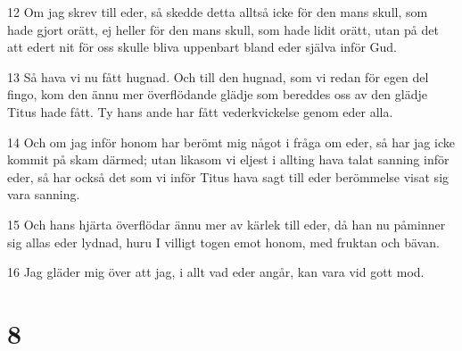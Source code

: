 \par 12 Om jag skrev till eder, så skedde detta alltså icke för den mans skull, som hade gjort orätt, ej heller för den mans skull, som hade lidit orätt, utan på det att edert nit för oss skulle bliva uppenbart bland eder själva inför Gud.
\par 13 Så hava vi nu fått hugnad. Och till den hugnad, som vi redan för egen del fingo, kom den ännu mer överflödande glädje som bereddes oss av den glädje Titus hade fått. Ty hans ande har fått vederkvickelse genom eder alla.
\par 14 Och om jag inför honom har berömt mig något i fråga om eder, så har jag icke kommit på skam därmed; utan likasom vi eljest i allting hava talat sanning inför eder, så har också det som vi inför Titus hava sagt till eder berömmelse visat sig vara sanning.
\par 15 Och hans hjärta överflödar ännu mer av kärlek till eder, då han nu påminner sig allas eder lydnad, huru I villigt togen emot honom, med fruktan och bävan.
\par 16 Jag gläder mig över att jag, i allt vad eder angår, kan vara vid gott mod.

\chapter{8}

